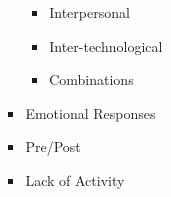 \begin{itemize}
\begin{itemize}
\begin{itemize}
\begin{itemize}
              \item Interpersonal

              \item Inter-technological

              \item Combinations

            \end{itemize}

          \item Emotional Responses

          \item Pre/Post

          \item Lack of Activity

        \end{itemize}

    \end{itemize}

\end{itemize}



